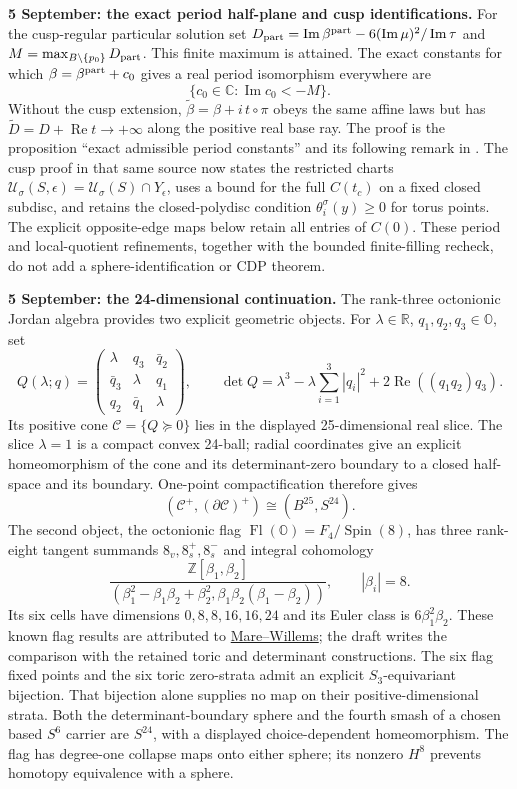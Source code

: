 \documentclass[10pt,letterpaper]{article}
\begin{document}
\noindent\textbf{5 September: the exact period half-plane and cusp identifications.}
For the cusp-regular particular solution set
$D_{\rm part}=\operatorname{Im}\beta^{\rm part}
-6(\operatorname{Im}\mu)^2/\operatorname{Im}\tau$ and
$M=\max_{B\setminus\{p_0\}}D_{\rm part}$. This finite maximum is
attained. The exact constants for which $\beta=\beta^{\rm part}+c_0$
gives a real period isomorphism everywhere are
\[
 \{c_0\in\mathbb C:\operatorname{Im}c_0<-M\}.
\]
Without the cusp extension, $\widetilde\beta=\beta+i\,t\circ\pi$
obeys the same affine laws but has
$\widetilde D=D+\operatorname{Re}t\to+\infty$ along the positive
real base ray. The proof is the proposition ``exact admissible period
constants'' and its following remark in .
The cusp proof in that same source now states the restricted charts
$\mathcal U_\sigma(S,\epsilon)=\mathcal U_\sigma(S)\cap Y_\epsilon$,
uses a bound for the full $C(t_c)$ on a fixed closed subdisc, and retains
the closed-polydisc condition $\theta_i^\sigma(y)\ge0$ for torus points.
The explicit opposite-edge maps below retain all entries of $C(0)$.
These period and local-quotient refinements, together with the bounded
finite-filling recheck, do not add a sphere-identification or CDP theorem.

\noindent\textbf{5 September: the 24-dimensional continuation.}
The rank-three octonionic Jordan algebra provides two explicit geometric
objects. For $\lambda\in\mathbb R$, $q_1,q_2,q_3\in\mathbb O$, set
\[
 Q(\lambda;q)=
 \begin{pmatrix}
 \lambda&q_3&\bar q_2\\
 \bar q_3&\lambda&q_1\\
 q_2&\bar q_1&\lambda
 \end{pmatrix},\qquad
 \det Q=\lambda^3-\lambda\sum_{i=1}^3|q_i|^2
             +2\operatorname{Re}((q_1q_2)q_3).
\]
Its positive cone $\mathcal C=\{Q\succeq0\}$ lies in the displayed
25-dimensional real slice. The slice $\lambda=1$ is a compact convex
24-ball; radial coordinates give an explicit homeomorphism of the cone
and its determinant-zero boundary to a closed half-space and its boundary.
One-point compactification therefore gives
\[
 (\mathcal C^+,(\partial\mathcal C)^+)\cong(B^{25},S^{24}).
\]
The second object, the octonionic flag $\operatorname{Fl}(\mathbb O)
=F_4/\operatorname{Spin}(8)$, has three rank-eight tangent summands
$8_v,8_s^+,8_s^-$ and integral cohomology
\[
 \frac{\mathbb Z[\beta_1,\beta_2]}
 {(\beta_1^2-\beta_1\beta_2+\beta_2^2,
       \beta_1\beta_2(\beta_1-\beta_2))},\qquad |\beta_i|=8.
\]
Its six cells have dimensions $0,8,8,16,16,24$ and its Euler class is
$6\beta_1^2\beta_2$. These known flag results are attributed to
\href{https://arxiv.org/abs/0809.4318}{Mare--Willems}; the draft writes
the comparison with the retained toric and determinant constructions.
The six flag fixed points and the six toric zero-strata admit an explicit
$S_3$-equivariant bijection. That bijection alone supplies no map on their
positive-dimensional strata. Both the determinant-boundary sphere and
the fourth smash of a chosen based $S^6$ carrier are $S^{24}$, with a
displayed choice-dependent homeomorphism. The flag has degree-one
collapse maps onto either sphere; its nonzero $H^8$ prevents homotopy
equivalence with a sphere.
\end{document}
